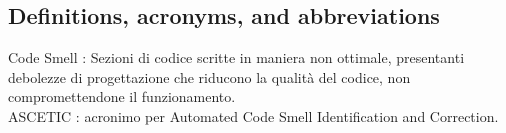 	   	
	   	\subsection{Definitions, acronyms, and abbreviations}
	   	
	   	Code Smell : Sezioni di codice scritte in maniera non ottimale, presentanti debolezze di progettazione che riducono la qualità del codice, non compromettendone il funzionamento.
	    \newline
	   	\\ASCETIC : acronimo per Automated Code Smell Identification and Correction. 